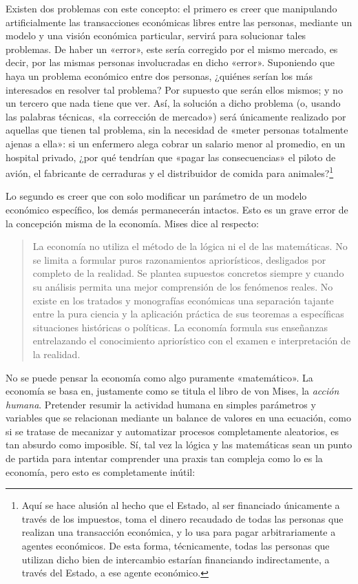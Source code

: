 \documentclass[12pt,a4paper,twoside]{book}
\begin{document}
Existen dos problemas con este concepto: el primero es creer que manipulando artificialmente las transacciones económicas libres entre las personas, mediante un modelo y una visión económica particular, servirá para solucionar tales problemas. De haber un «error», este sería corregido por el mismo mercado, es decir, por las mismas personas involucradas en dicho «error». Suponiendo que haya un problema económico entre dos personas, ¿quiénes serían los más interesados en resolver tal problema? Por supuesto que serán ellos mismos; y no un tercero que nada tiene que ver. Así, la solución a dicho problema (o, usando las palabras técnicas, «la corrección de mercado») será únicamente realizado por aquellas que tienen tal problema, sin la necesidad de «meter personas totalmente ajenas a ella»: si un enfermero alega cobrar un salario menor al promedio, en un hospital privado, ¿por qué tendrían que «pagar las consecuencias» el piloto de avión, el fabricante de cerraduras y el distribuidor de comida para animales?\footnote{Aquí se hace alusión al hecho que el Estado, al ser financiado únicamente a través de los impuestos, toma el dinero recaudado de todas las personas que realizan una transacción económica, y lo usa para pagar arbitrariamente a agentes económicos. De esta forma, técnicamente, todas las personas que utilizan dicho bien de intercambio estarían financiando indirectamente, a través del Estado, a ese agente económico.}

Lo segundo es creer que con solo modificar un parámetro de un modelo económico específico, los demás permanecerán intactos. Esto es un grave error de la concepción misma de la economía. Mises dice al respecto:

\begin{quotation}
La economía no utiliza el método de la lógica ni el de las matemáticas. No se limita a formular puros razonamientos apriorísticos, desligados por completo de la realidad. Se plantea supuestos concretos siempre y cuando su análisis permita una mejor comprensión de los fenómenos reales. No existe en los tratados y monografías económicas una separación tajante entre la pura ciencia y la aplicación práctica de sus teoremas a específicas situaciones históricas o políticas. La economía formula sus enseñanzas entrelazando el conocimiento apriorístico con el examen e interpretación de la realidad. \cite[pág. 79-80]{mises:lah}
\end{quotation}

No se puede pensar la economía como algo puramente «matemático». La economía se basa en, justamente como se titula el libro de von Mises, la \textit{acción humana}. Pretender resumir la actividad humana en simples parámetros y variables que se relacionan mediante un balance de valores en una ecuación, como si se tratase de mecanizar y automatizar procesos completamente aleatorios, es tan absurdo como imposible. Sí, tal vez la lógica y las matemáticas sean un punto de partida para intentar comprender una praxis tan compleja como lo es la economía, pero esto es completamente inútil:
\end{document}

